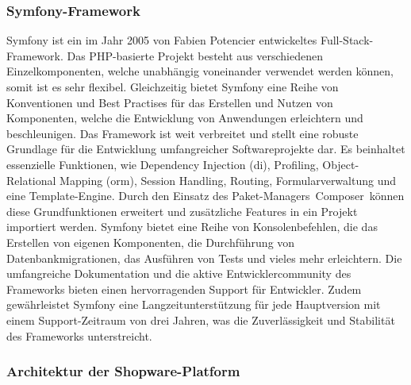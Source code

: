 \subsubsection{Symfony-Framework}

Symfony ist ein im Jahr 2005 von Fabien Potencier entwickeltes Full-Stack-Framework.
Das PHP-basierte Projekt besteht aus verschiedenen Einzelkomponenten, welche unabhängig voneinander verwendet werden
können, somit ist es sehr flexibel.
Gleichzeitig bietet Symfony eine Reihe von Konventionen und Best Practises für das Erstellen und Nutzen von Komponenten,
welche die Entwicklung von Anwendungen erleichtern und beschleunigen.
Das Framework ist weit verbreitet und stellt eine robuste Grundlage für die Entwicklung umfangreicher Softwareprojekte
dar.
Es beinhaltet essenzielle Funktionen, wie Dependency Injection (\acrshort{di}), Profiling, Object-Relational Mapping
(\acrshort{orm}), Session Handling, Routing, Formularverwaltung und eine Template-Engine.
Durch den Einsatz des Paket-Managers\ \glqq Composer\grqq\ können diese Grundfunktionen erweitert und zusätzliche
Features in ein Projekt importiert werden.
Symfony bietet eine Reihe von Konsolenbefehlen, die das Erstellen von eigenen Komponenten, die Durchführung von
Datenbankmigrationen, das Ausführen von Tests und vieles mehr erleichtern.
Die umfangreiche Dokumentation und die aktive Entwicklercommunity des Frameworks bieten einen hervorragenden Support
für Entwickler.
Zudem gewährleistet Symfony eine Langzeitunterstützung für jede Hauptversion mit einem Support-Zeitraum von drei Jahren,
was die Zuverlässigkeit und Stabilität des Frameworks unterstreicht.

\subsubsection{Architektur der Shopware-Platform}

